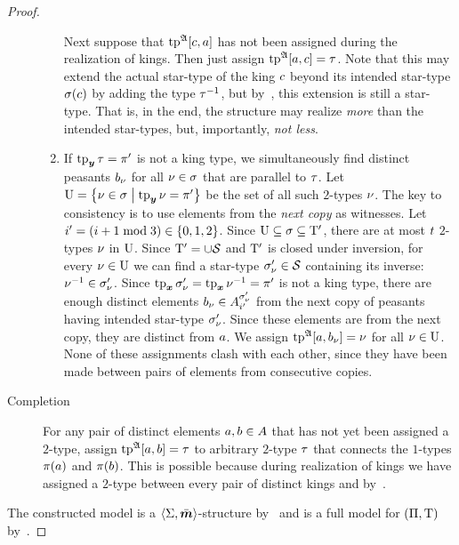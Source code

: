 \begin{proof}
\begin{description}
\begin{enumerate}
    Next suppose that $\operatorname{tp}^{\mathfrak{A}}[c,a]$ has not been assigned during the
    realization of kings. Then just assign $\operatorname{tp}^{\mathfrak{A}}[a,c] = \tau$.
    Note that this may extend the actual star-type of the king $c$ beyond its
    intended star-type $\sigma(c)$ by adding the type $\tau^{-1}$, but
    by~, this extension is still a star-type. That is,
    in the end, the structure may realize \emph{more} than the intended
    star-types, but, importantly, \emph{not less}.
    \item If $\operatorname{tp}_{\bm{y}}\tau = {\pi'}$ is not a king type, we simultaneously find
    distinct peasants $b_{\nu}$ for all $\nu \in \sigma$ that are parallel to
    $\tau$.
    Let $\mathrm{U} = \left\{\nu \in \sigma\mathrel{}\middle|\mathrel{}\operatorname{tp}_{\bm{y}}\nu = {\pi'}\right\}$ be the set of
    all such $2$-types $\nu$.
    The key to consistency is to use elements from the \emph{next copy} as
    witnesses. Let ${i'} = (i+1 \bmod 3) \in \left\{0,1,2\right\}$. Since $\mathrm{U}
    \subseteq \sigma \subseteq {\mathrm{T}'}$, there are at most $t$ $2$-types $\nu$ in $\mathrm{U}$. Since ${\mathrm{T}'} = \cup\mathcal{S}$ and ${\mathrm{T}'}$ is
    closed under inversion, for every $\nu \in \mathrm{U}$ we can find a star-type
    ${\sigma_{\nu}'} \in \mathcal{S}$ containing its inverse: $\nu^{-1} \in
    {\sigma_{\nu}'}$. Since $\operatorname{tp}_{\bm{x}}{\sigma_{\nu}'} = \operatorname{tp}_{\bm{x}}\nu^{-1} = {\pi'}$ is not
    a king type, there are enough distinct elements $b_{\nu} \in
    A^{{\sigma_{\nu}'}}_{{i'}}$ from the next copy of peasants having intended
    star-type ${\sigma_{\nu}'}$. Since these elements are from the next copy, they
    are distinct from $a$.
    We assign $\operatorname{tp}^{\mathfrak{A}}[a,b_{\nu}] = \nu$ for all $\nu \in \mathrm{U}$.
    None of these assignments clash with each other, since they have been made
    between pairs of elements from consecutive copies.
  \end{enumerate}
  \item[Completion] For any pair of distinct elements $a, b \in A$ that
  has not yet been assigned a $2$-type, assign $\operatorname{tp}^{\mathfrak{A}}[a,b] = \tau$ to
  arbitrary $2$-type $\tau$ that connects the $1$-types $\pi(a)$ and
  $\pi(b)$. This is possible because during realization of kings we have
  assigned a $2$-type between every pair of distinct kings and by~.
\end{description}
The constructed model is a $\left\langle \mathrm{\Sigma},\bar{\bm{m}} \right\rangle$-structure by~ and is a
full model for $(\Pi,\mathrm{T})$ by~.
\end{proof}

